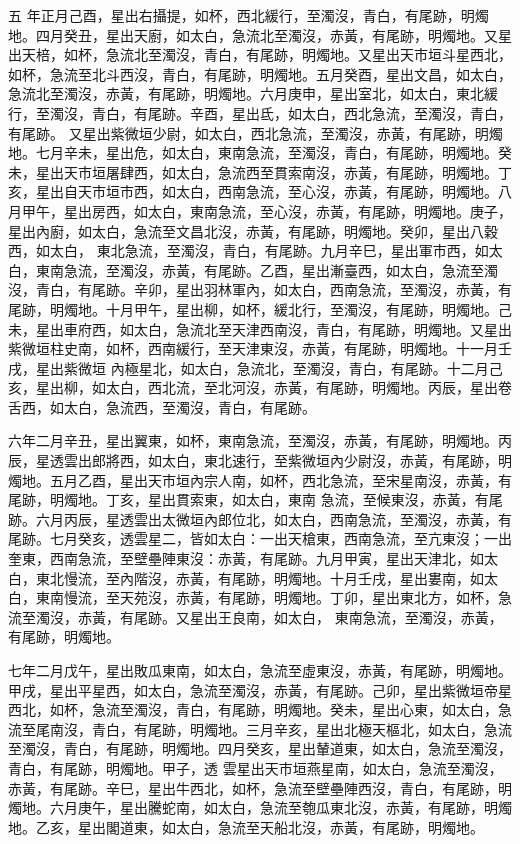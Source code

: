 \begin{pinyinscope}
 五
 年正月己酉，星出右攝提，如杯，西北緩行，至濁沒，青白，有尾跡，明燭地。四月癸丑，星出天廚，如太白，急流北至濁沒，赤黃，有尾跡，明燭地。又星出天棓，如杯，急流北至濁沒，青白，有尾跡，明燭地。又星出天市垣斗星西北，如杯，急流至北斗西沒，青白，有尾跡，明燭地。五月癸酉，星出文昌，如太白，急流北至濁沒，赤黃，有尾跡，明燭地。六月庚申，星出室北，如太白，東北緩行，至濁沒，青白，有尾跡。辛酉，星出氐，如太白，西北急流，至濁沒，青白，有尾跡。
 又星出紫微垣少尉，如太白，西北急流，至濁沒，赤黃，有尾跡，明燭地。七月辛未，星出危，如太白，東南急流，至濁沒，青白，有尾跡，明燭地。癸未，星出天市垣屠肆西，如太白，急流西至貫索南沒，赤黃，有尾跡，明燭地。丁亥，星出自天市垣市西，如太白，西南急流，至心沒，赤黃，有尾跡，明燭地。八月甲午，星出房西，如太白，東南急流，至心沒，赤黃，有尾跡，明燭地。庚子，星出內廚，如太白，急流至文昌北沒，赤黃，有尾跡，明燭地。癸卯，星出八穀西，如太白，
 東北急流，至濁沒，青白，有尾跡。九月辛巳，星出軍市西，如太白，東南急流，至濁沒，赤黃，有尾跡。乙酉，星出漸臺西，如太白，急流至濁沒，青白，有尾跡。辛卯，星出羽林軍內，如太白，西南急流，至濁沒，赤黃，有尾跡，明燭地。十月甲午，星出柳，如杯，緩北行，至濁沒，有尾跡，明燭地。己未，星出車府西，如太白，急流北至天津西南沒，青白，有尾跡，明燭地。又星出紫微垣柱史南，如杯，西南緩行，至天津東沒，赤黃，有尾跡，明燭地。十一月壬戌，星出紫微垣
 內極星北，如太白，急流北，至濁沒，青白，有尾跡。十二月己亥，星出柳，如太白，西北流，至北河沒，赤黃，有尾跡，明燭地。丙辰，星出卷舌西，如太白，急流西，至濁沒，青白，有尾跡。



 六年二月辛丑，星出翼東，如杯，東南急流，至濁沒，赤黃，有尾跡，明燭地。丙辰，星透雲出郎將西，如太白，東北速行，至紫微垣內少尉沒，赤黃，有尾跡，明燭地。五月乙酉，星出天市垣內宗人南，如杯，西北急流，至宋星南沒，赤黃，有尾跡，明燭地。丁亥，星出貫索東，如太白，東南
 急流，至候東沒，赤黃，有尾跡。六月丙辰，星透雲出太微垣內郎位北，如太白，西南急流，至濁沒，赤黃，有尾跡。七月癸亥，透雲星二，皆如太白：一出天槍東，西南急流，至亢東沒；一出奎東，西南急流，至壁壘陣東沒：赤黃，有尾跡。九月甲寅，星出天津北，如太白，東北慢流，至內階沒，赤黃，有尾跡，明燭地。十月壬戌，星出婁南，如太白，東南慢流，至天苑沒，赤黃，有尾跡，明燭地。丁卯，星出東北方，如杯，急流至濁沒，赤黃，有尾跡。又星出王良南，如太白，
 東南急流，至濁沒，赤黃，有尾跡，明燭地。



 七年二月戊午，星出敗瓜東南，如太白，急流至虛東沒，赤黃，有尾跡，明燭地。甲戌，星出平星西，如太白，急流至濁沒，赤黃，有尾跡。己卯，星出紫微垣帝星西北，如杯，急流至濁沒，青白，有尾跡，明燭地。癸未，星出心東，如太白，急流至尾南沒，青白，有尾跡，明燭地。三月辛亥，星出北極天樞北，如太白，急流至濁沒，青白，有尾跡，明燭地。四月癸亥，星出輦道東，如太白，急流至濁沒，青白，有尾跡，明燭地。甲子，透
 雲星出天市垣燕星南，如太白，急流至濁沒，赤黃，有尾跡。辛巳，星出牛西北，如杯，急流至壁壘陣西沒，青白，有尾跡，明燭地。六月庚午，星出騰蛇南，如太白，急流至匏瓜東北沒，赤黃，有尾跡，明燭地。乙亥，星出閣道東，如太白，急流至天船北沒，赤黃，有尾跡，明燭地。




\end{pinyinscope}
